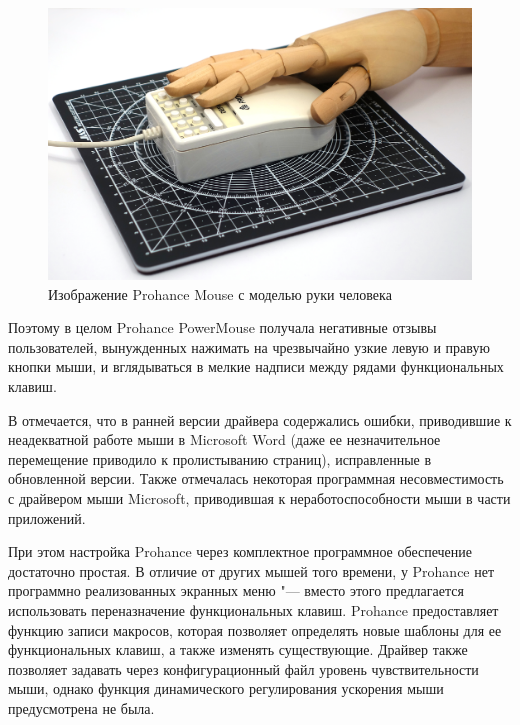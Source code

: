 \documentclass[11pt, a4paper]{article}
\begin{document}
\begin{figure}[h]
    \centering
    \includegraphics[scale=0.4]{1989_prohance_powermouse/hand_30.jpg}
    \caption{Изображение Prohance Mouse с моделью руки человека}
    \label{fig:ProhanceHand}
\end{figure}

Поэтому в целом Prohance PowerMouse получала негативные отзывы пользователей, вынужденных нажимать на чрезвычайно узкие левую и правую кнопки мыши, и вглядываться в мелкие надписи между рядами функциональных клавиш.

В \cite{prohance} отмечается, что в ранней версии драйвера содержались ошибки, приводившие к неадекватной работе мыши в Microsoft Word (даже ее незначительное перемещение приводило к пролистыванию страниц), исправленные в обновленной версии. Также отмечалась некоторая программная несовместимость с драйвером мыши Microsoft, приводившая к неработоспособности мыши в части приложений.

При этом настройка Prohance через комплектное программное обеспечение достаточно простая. В отличие от других мышей того времени, у Prohance нет программно реализованных экранных меню "--- вместо этого предлагается использовать переназначение функциональных клавиш. Prohance предоставляет функцию записи макросов, которая позволяет определять новые шаблоны для ее функциональных клавиш, а также изменять существующие.
Драйвер также позволяет задавать через конфигурационный файл уровень чувствительности мыши, однако функция динамического регулирования ускорения мыши предусмотрена не была.
\end{document}

